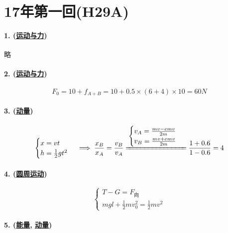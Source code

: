 
\section{17年第一回(H29A)}

\paragraph{1. (\hyperref[subsec:运动与力]{运动与力})} 略
\paragraph{2. (\hyperref[subsec:运动与力]{运动与力})}

\begin{equation*}
    F_0=10+f_{A+B}=10+0.5\times(6+4)\times10=60N
\end{equation*}

\paragraph{3. (\hyperref[subsec:动量]{动量})}

\begin{gather*}
    \begin{cases}
        x=vt\\h=\frac12gt^2
    \end{cases}\implies
    \frac{x_B}{x_A}=\frac{v_B}{v_A}
    \xlongequal{\begin{cases}
        v_A=\frac{mv-emv}{2m}\\
        v_B=\frac{mv+emv}{2m}
    \end{cases}}
    \frac{1+0.6}{1-0.6}=4
\end{gather*}

\paragraph{4. (\hyperref[subsec:圆周运动]{圆周运动})}

\begin{equation*}
    \begin{cases}
        T-G=F_\textrm{向}\\
        mgl+\frac12mv_0^2=\frac12mv^2
    \end{cases}
\end{equation*}

\paragraph{5. (\hyperref[subsec:能量]{能量}, \hyperref[subsec:动量]{动量})}

